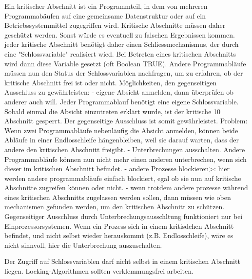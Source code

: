 \begin{answer}
Ein kritischer Abschnitt ist ein Programmteil, in dem von mehreren Programmabäufen auf eine gemeinsame
Datenstruktur oder auf ein Betriebssystemmittel zugegriffen wird. Kritische Abschnitte
müssen daher geschützt werden. Sonst würde es eventuell zu falschen Ergebnissen kommen. jeder
kritische Abschnitt benötigt daher einen Schliessmechanismus, der durch eine "Schlossvariable"
realisiert wied. Bei Betreten eines kritischen Abschnitts wird dann diese Variable gesetzt (oft Boolean
TRUE). Andere Programmabläufe müssen nun den Status der Schlossvariablen nachfragen,
um zu erfahren, ob der kritische Abschnitt frei ist oder nicht.
Möglichkeiten, den gegenseitigen Ausschluss zu gewährleisten:
- eigene Absicht anmelden, dann überprüfen ob anderer auch will. Jeder Programmablauf benötigt
eine eigene Schlossvariable. Sobald einmal die Absicht einzutreten erklärt wurde, ist der kritische
10
Abschnitt gesperrt. Der gegenseitige Ausschluss ist somit gewährleistet.
Problem: Wenn zwei Programmabläufe nebenläufig die Absicht anmelden, können beide Abläufe
in einer Endlosschleife hängenbleiben, weil sie darauf warten, dass der andere den kritischen Abschnitt
freigibt.
- Unterbrechungen ausschalten. Andere Programmabläufe können nun nicht mehr einen anderen
unterbrechen, wenn sich dieser im kritischen Abschnitt befindet.
- andere Prozesse blockieren>: hier werden andere programmabläufe einfach blockiert, egal ob sie
nun auf kritische Abschnitte zugreifen können oder nicht.
- wenn trotdem andere prozesse während eines kritischen Abschnitts zugelassen werden sollen,
dann müssen wie oben mechanismen gefunden werden, um den kritischen Abschnitt zu schützen.
Gegenseitiger Ausschluss durch Unterbrechungsausschltung funktioniert nur bei Einprozessorsystemen.
Wenn ein Prozess sich in einem kritisdchen Abschnitt befindet, und nicht selbst wieder
herauskommt (z.B. Endlosschleife), wäre es nicht sinnvoll, hier die Unterbrechung auszuschalten.
\end{answer}

\begin{answer}
Der Zugriff auf Schlossvariablen darf nicht selbst in einem kritischen Abschnitt liegen. Locking-Algorithmen sollten verklemmungsfrei arbeiten.
\end{answer}

